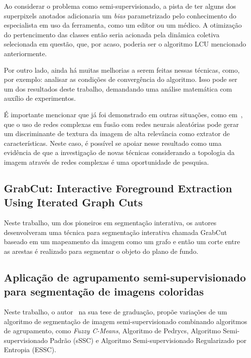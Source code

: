 Ao considerar o problema como semi-supervisionado, a pista de ter
alguns dos superpixels anotados adicionaria um \textit{bias}
parametrizado pelo conhecimento do especialista em uso da ferramenta,
como um editor ou um médico. A otimização do pertencimento das classes
então seria acionada pela dinâmica coletiva selecionada em questão,
que, por acaso, poderia ser o algoritmo \gls{LCU} mencionado anteriormente.

Por outro lado, ainda há muitas melhorias a serem feitas nessas técnicas, como,
por exemplo: analisar as condições de convergência do algoritmo. Isso
pode ser um dos resultados deste trabalho, demandando uma análise
matemática com auxílio de experimentos.

É importante mencionar que já foi demonstrado em outras situações,
como em~\cite{JarbasComplexNetworks2020}, que o uso de redes complexas
em fusão com redes neurais aleatórias pode gerar um discriminante de
textura da imagem de alta relevância como extrator de
características. Neste caso, é possível se apoiar nesse resultado como
uma evidência de que a investigação de novas técnicas considerando a
topologia da imagem através de redes complexas é uma oportunidade de
pesquisa.


\subsection{GrabCut: Interactive Foreground Extraction Using Iterated
  Graph Cuts}\label{sec:grabcut}

Neste trabalho, um dos pioneiros em segmentação interativa, os
autores~\cite{rother2004grabcut} desenvolveram uma técnica para segmentação interativa
chamada GrabCut baseado em um mapeamento da imagem como um grafo e
então um corte entre as arestas é realizado para segmentar o objeto do
plano de fundo.


\subsection{Aplicação de agrupamento semi-supervisionado para segmentação
  de imagens coloridas}\label{sec:franciscolira2018}

Neste trabalho, o autor~\cite{franciscolira2018} na sua tese de
graduação, propõe variações de um algoritmo de segmentação de imagem
semi-supervisionado combinando algoritmos de agrupamento, como
\textit{Fuzzy C-Means}, Algoritmo de Pedrycs, Algoritmo
Semi-supervisionado Padrão (sSSC) e Algoritmo Semi-supervisionado
Regularizado por Entropia (ESSC).

